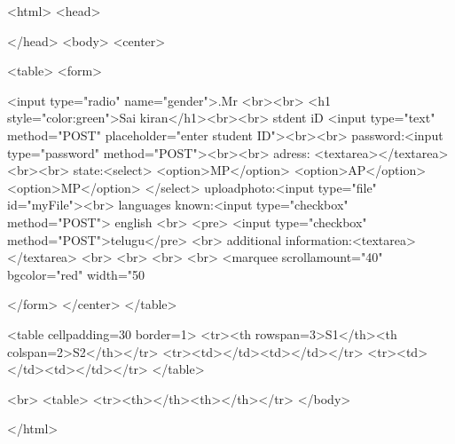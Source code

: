 <html>
<head>

</head>
<body>
<center>

<table>
<form>

<input type="radio" name="gender">.Mr <br><br>
<h1 style="color:green">Sai kiran</h1><br><br>
stdent iD <input type="text" method="POST" placeholder="enter student ID"><br><br> 
password:<input type="password" method="POST"><br><br>
adress:
<textarea></textarea><br><br>
state:<select>
<option>MP</option>
<option>AP</option>
<option>MP</option>
</select>
uploadphoto:<input type="file" id="myFile"><br>
languages known:<input type="checkbox" method="POST"> english <br>
<pre>               <input type="checkbox" method="POST">telugu</pre>
<br>
additional information:<textarea></textarea>
<br>
<br>
<br>
<br>
<marquee scrollamount="40" bgcolor="red" width="50%


</form>
</center>
</table>

<table cellpadding=30  border=1>
<tr><th rowspan=3>S1</th><th colspan=2>S2</th></tr>
<tr><td></td><td></td></tr>
<tr><td></td><td></td></tr>
</table>

<br>
<table>
<tr><th></th><th></th></tr>
</body>

</html>